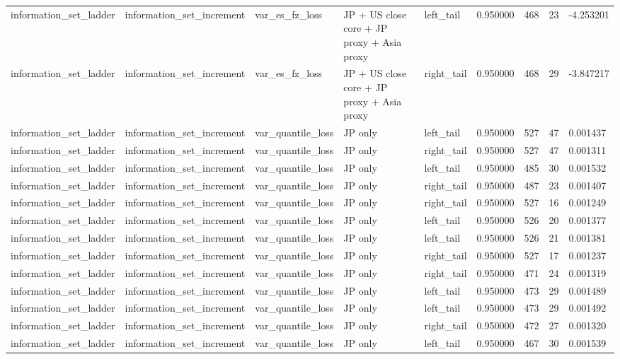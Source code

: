 \begin{tabular}{lllllrrr}
information\_set\_ladder & information\_set\_increment & var\_es\_fz\_loss & JP + US close core + JP proxy + Asia proxy & left\_tail & 0.950000 & 468 & 23 & -4.253201 \\
information\_set\_ladder & information\_set\_increment & var\_es\_fz\_loss & JP + US close core + JP proxy + Asia proxy & right\_tail & 0.950000 & 468 & 29 & -3.847217 \\
information\_set\_ladder & information\_set\_increment & var\_quantile\_loss & JP only & left\_tail & 0.950000 & 527 & 47 & 0.001437 \\
information\_set\_ladder & information\_set\_increment & var\_quantile\_loss & JP only & right\_tail & 0.950000 & 527 & 47 & 0.001311 \\
information\_set\_ladder & information\_set\_increment & var\_quantile\_loss & JP only & left\_tail & 0.950000 & 485 & 30 & 0.001532 \\
information\_set\_ladder & information\_set\_increment & var\_quantile\_loss & JP only & right\_tail & 0.950000 & 487 & 23 & 0.001407 \\
information\_set\_ladder & information\_set\_increment & var\_quantile\_loss & JP only & right\_tail & 0.950000 & 527 & 16 & 0.001249 \\
information\_set\_ladder & information\_set\_increment & var\_quantile\_loss & JP only & left\_tail & 0.950000 & 526 & 20 & 0.001377 \\
information\_set\_ladder & information\_set\_increment & var\_quantile\_loss & JP only & left\_tail & 0.950000 & 526 & 21 & 0.001381 \\
information\_set\_ladder & information\_set\_increment & var\_quantile\_loss & JP only & right\_tail & 0.950000 & 527 & 17 & 0.001237 \\
information\_set\_ladder & information\_set\_increment & var\_quantile\_loss & JP only & right\_tail & 0.950000 & 471 & 24 & 0.001319 \\
information\_set\_ladder & information\_set\_increment & var\_quantile\_loss & JP only & left\_tail & 0.950000 & 473 & 29 & 0.001489 \\
information\_set\_ladder & information\_set\_increment & var\_quantile\_loss & JP only & left\_tail & 0.950000 & 473 & 29 & 0.001492 \\
information\_set\_ladder & information\_set\_increment & var\_quantile\_loss & JP only & right\_tail & 0.950000 & 472 & 27 & 0.001320 \\
information\_set\_ladder & information\_set\_increment & var\_quantile\_loss & JP only & left\_tail & 0.950000 & 467 & 30 & 0.001539 \\

\end{tabular}
